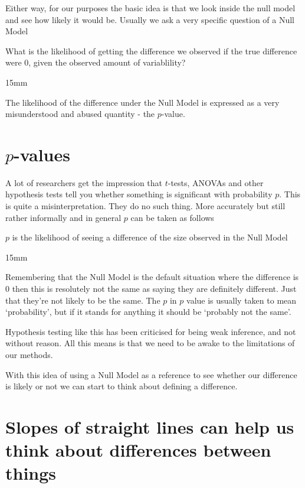 \documentclass[
]{book}
\newenvironment{myquote}
{\begin{large}
\begin{itshape}
\begin{minipage}{6cm}
}
{
\begin{vspace}{15mm}
\end{vspace}
\end{minipage}
\end{itshape}
\end{large} 
}
\begin{document}
Either way, for our purposes the basic idea is that we look inside the null model and see how likely it would be. Usually we ask a very specific question of a Null Model

\begin{myquote}
What is the likelihood of getting the difference we observed if the true difference were 0, given the observed amount of variablility?
\end{myquote}

The likelihood of the difference under the Null Model is expressed as a very misunderstood and abused quantity - the \(p\)-value.

\hypertarget{p-values}{%
\section{\texorpdfstring{\(p\)-values}{p-values}}\label{p-values}}

A lot of researchers get the impression that \(t\)-tests, ANOVAs and other hypothesis tests tell you whether something is significant with probability \(p\). This is quite a misinterpretation. They do no such thing. More accurately but still rather informally and in general \(p\) can be taken as follows

\begin{myquote}
\(p\) is the likelihood of seeing a difference of the size observed in the Null Model
\end{myquote}

Remembering that the Null Model is the default situation where the difference is 0 then this is resolutely not the same as saying they are definitely different. Just that they're not likely to be the same. The \(p\) in \(p\) value is usually taken to mean `probability', but if it stands for anything it should be `probably not the same'.

Hypothesis testing like this has been criticised for being weak inference, and not without reason. All this means is that we need to be awake to the limitations of our methods.

With this idea of using a Null Model as a reference to see whether our difference is likely or not we can start to think about defining a difference.

\hypertarget{slopes-of-straight-lines-can-help-us-think-about-differences-between-things}{%
\section{Slopes of straight lines can help us think about differences between things}\label{slopes-of-straight-lines-can-help-us-think-about-differences-between-things}}
\end{document}
